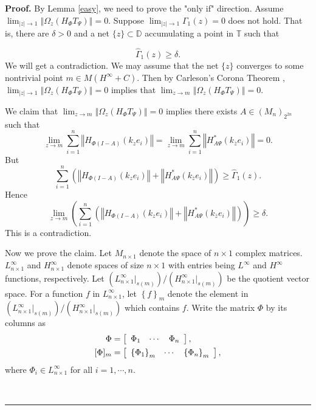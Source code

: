 \documentclass{article}%
\newenvironment{proof}[1][Proof]{\noindent\textbf{#1.} }{\ \rule{0.5em}{0.5em}}
\begin{document}
\begin{proof}
By Lemma \ref{easy}, we need to prove the "only if" direction. Assume
$\lim_{\left\vert z\right\vert \rightarrow1}\left\Vert \Omega_{z}(H_{\Phi
}T_{\Psi})\right\Vert =0$. Suppose $\lim_{\left\vert z\right\vert
\rightarrow1}\Gamma_{1}(z)=0$ does not hold. That is, there are $\delta>0$ and
a net $\{z\}\subset\mathbb{D}$ accumulating a point in $\mathbb{T}$ such that%

\[
\widehat{\Gamma}_{1}(z)\geq\delta.
\]
We will get a contradiction. We may assume that the net $\{z\}$ converges to
some nontrivial point $m\in M\left(  H^{\infty}+C\right)  $. Then by
Carleson's Corona Theorem \cite{Garnett}, $\lim_{\left\vert z\right\vert
\rightarrow1}\left\Vert \Omega_{z}(H_{\Phi}T_{\Psi})\right\Vert =0$ implies
that $\lim_{z\rightarrow m}\left\Vert \Omega_{z}(H_{\Phi}T_{\Psi})\right\Vert
=0.$

We claim that $\lim_{z\rightarrow m}\left\Vert \Omega_{z}(H_{\Phi}T_{\Psi
})\right\Vert =0$ implies there exists $A\in\left(  M_{n}\right)  _{2^{2n}}$
such that
\begin{equation}
\lim_{z\rightarrow m}\sum_{i=1}^{n}\left\Vert H_{\Phi(I-A)}\left(  k_{z}%
e_{i}\right)  \right\Vert =\lim_{z\rightarrow m}\sum_{i=1}^{n}\left\Vert
H_{A\Psi}^{\ast}\left(  k_{\overline{z}}e_{i}\right)  \right\Vert =0.
\label{claim}%
\end{equation}
But%
\[
\sum_{i=1}^{n}\left(  \left\Vert H_{\Phi(I-A)}\left(  k_{z}e_{i}\right)
\right\Vert +\left\Vert H_{A\Psi}^{\ast}\left(  k_{\overline{z}}e_{i}\right)
\right\Vert \right)  \geq\widehat{\Gamma}_{1}(z).
\]
Hence%
\[
\lim_{z\rightarrow m}\left(  \sum_{i=1}^{n}\left(  \left\Vert H_{\Phi
(I-A)}\left(  k_{z}e_{i}\right)  \right\Vert +\left\Vert H_{A\Psi}^{\ast
}\left(  k_{\overline{z}}e_{i}\right)  \right\Vert \right)  \right)
\geq\delta.
\]
This is a contradiction.

Now we prove the claim. Let $M_{n\times1}$ denote the space of $n\times1$
complex matrices. $L_{n\times1}^{\infty}$ and $H_{n\times1}^{\infty}$ denote
spaces of size $n\times1$ with entries being $L^{\infty}$ and $H^{\infty}$
functions, respectively. Let $(L_{n\times1}^{\infty}|_{s(m)})/(H_{n\times
1}^{\infty}|_{s(m)})$ be the quotient vector space. For a function $f$ in
$L_{n\times1}^{\infty}$, let $\left\{  f\right\}  _{m}$ denote the element in
$(L_{n\times1}^{\infty}|_{s(m)})/(H_{n\times1}^{\infty}|_{s(m)})$ which
contains $f$. Write the matrix $\Phi$ by its columns as
\begin{align*}
\Phi &  =\left[
\begin{array}
[c]{ccc}%
\Phi_{1} & \cdots & \Phi_{n}%
\end{array}
\right]  ,\\
\lbrack\Phi]_{m} &  =\left[
\begin{array}
[c]{ccc}%
\left\{  \Phi_{1}\right\}  _{m} & \cdots & \left\{  \Phi_{n}\right\}  _{m}%
\end{array}
\right]  ,
\end{align*}
where $\Phi_{i}\in L_{n\times1}^{\infty}$ for all $i=1,\cdots,n$.


\end{proof}
\end{document}
